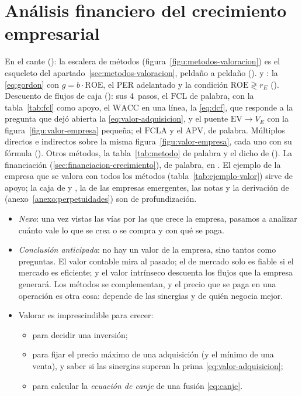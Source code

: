 \documentclass[11pt]{article}
\begin{document}
\section{Análisis financiero del crecimiento empresarial}\label{sec:analisis-financiero}

\begin{notaopositor}
En el cante (): la escalera de métodos (figura~\ref{figu:metodos-valoracion}) es el esqueleto del apartado~\ref{sec:metodos-valoracion}, peldaño a peldaño ().  y : la \eqref{eq:gordon} con $g=b\cdot\mathrm{ROE}$, el PER adelantado y la condición $\mathrm{ROE}\gtrless r_E$ (). Descuento de flujos de caja (): sus 4~pasos, el $\mathrm{FCL}$ de palabra, con la tabla~\ref{tab:fcl} como apoyo, el $\mathrm{WACC}$ en una línea, la \eqref{eq:dcf}, que responde a la pregunta que dejó abierta la \eqref{eq:valor-adquisicion}, y el puente $\mathrm{EV}\to V_E$ con la figura~\ref{figu:valor-empresa} pequeña; el $\mathrm{FCLA}$ y el APV, de palabra. Múltiplos directos e indirectos sobre la misma figura~\ref{figu:valor-empresa}, cada uno con su fórmula (). Otros métodos, la tabla~\ref{tab:metodo} de palabra y el dicho de  (). La financiación (\ref{sec:financiacion-crecimiento}), de palabra, en . El ejemplo de la empresa que se valora con todos los métodos (tabla~\ref{tab:ejemplo-valor}) sirve de apoyo; la caja de  y , la de las empresas emergentes, las notas y la derivación de  (anexo~\ref{anexo:perpetuidades}) son de profundización.
\end{notaopositor}

\begin{itemize}
\item \emph{Nexo}: una vez vistas las vías por las que crece la empresa, pasamos a analizar cuánto vale lo que se crea o se compra y con qué se paga.
\item \emph{Conclusión anticipada}: no hay un valor de la empresa, sino tantos como preguntas. El valor contable mira al pasado; el de mercado solo es fiable si el mercado es eficiente; y el valor intrínseco descuenta los flujos que la empresa generará. Los métodos se complementan, y el precio que se paga en una operación es otra cosa: depende de las sinergias y de quién negocia mejor.
\item Valorar es imprescindible para crecer:
  \begin{itemize}
  \item para decidir una inversión;
  \item para fijar el precio máximo de una adquisición (y el mínimo de una venta), y saber si las sinergias superan la prima \eqref{eq:valor-adquisicion};
  \item para calcular la \emph{ecuación de canje} de una fusión \eqref{eq:canje}.
  \end{itemize}
\end{itemize}
\end{document}

